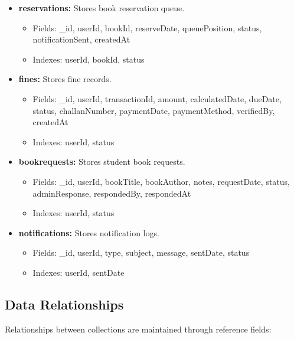 \documentclass[12pt,a4paper]{report}
\begin{document}
\begin{itemize}
    \item \textbf{reservations:} Stores book reservation queue.
    \begin{itemize}
        \item Fields: \_id, userId, bookId, reserveDate, queuePosition, status, notificationSent, createdAt
        \item Indexes: userId, bookId, status
    \end{itemize}
    
    \item \textbf{fines:} Stores fine records.
    \begin{itemize}
        \item Fields: \_id, userId, transactionId, amount, calculatedDate, dueDate, status, challanNumber, paymentDate, paymentMethod, verifiedBy, createdAt
        \item Indexes: userId, status
    \end{itemize}
    
    \item \textbf{bookrequests:} Stores student book requests.
    \begin{itemize}
        \item Fields: \_id, userId, bookTitle, bookAuthor, notes, requestDate, status, adminResponse, respondedBy, respondedAt
        \item Indexes: userId, status
    \end{itemize}
    
    \item \textbf{notifications:} Stores notification logs.
    \begin{itemize}
        \item Fields: \_id, userId, type, subject, message, sentDate, status
        \item Indexes: userId, sentDate
    \end{itemize}
\end{itemize}

\subsection{Data Relationships}

Relationships between collections are maintained through reference fields:
\end{document}
